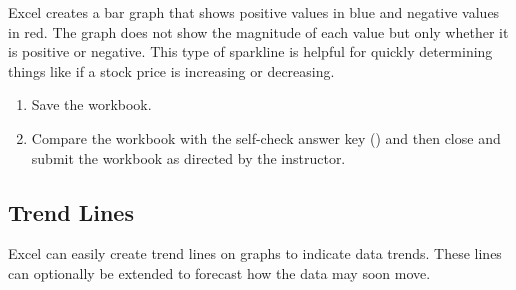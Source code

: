 Excel creates a bar graph that shows positive values in blue and negative values in red. The graph does not show the magnitude of each value but only whether it is positive or negative. This type of sparkline is helpful for quickly determining things like if a stock price is increasing or decreasing.

\begin{enumbox}
	\begin{enumerate}
		\item Save the  workbook.
		\item Compare the workbook with the self-check answer key () and then close and submit the  workbook as directed by the instructor.
	\end{enumerate}
\end{enumbox}
	
\subsection{Trend Lines}

Excel can easily create trend lines on graphs to indicate data trends. These lines can optionally be extended to forecast how the data may soon move.

